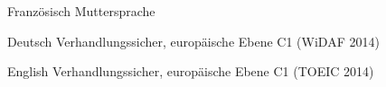 

\begin{cvskills}
  \cvskill
    {Französisch} %
    {Muttersprache} %
    
  \cvskill
	{Deutsch} %
	{Verhandlungssicher, europäische Ebene C1 (WiDAF 2014)} %
	
  \cvskill
	{English} %
	{Verhandlungssicher, europäische Ebene C1 (TOEIC 2014)} %
	
\end{cvskills}
